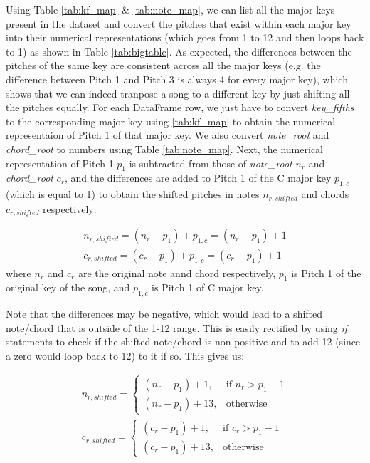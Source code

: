Using Table \ref{tab:kf_map} \& \ref{tab:note_map}, we can list all the major keys present in the dataset and convert the pitches that exist within each major key into their numerical representations (which goes from 1 to 12 and then loops back to 1) as shown in Table \ref{tab:bigtable}. As expected, the differences between the pitches of the same key are consistent across all the major keys (e.g. the difference between Pitch 1 and Pitch 3 is always 4 for every major key), which shows that we can indeed tranpose a song to a different key by just shifting all the pitches equally. For each DataFrame row, we just have to convert \emph{key\_fifths} to the corresponding major key using \ref{tab:kf_map} to obtain the numerical representaion of Pitch 1 of that major key. We also convert \emph{note\_root} and \emph{chord\_root} to numbers using Table \ref{tab:note_map}. Next, the numerical representation of Pitch 1 $p_1$ is subtracted from those of \emph{note\_root} $n_r$ and \emph{chord\_root} $c_r$, and the differences are added to Pitch 1 of the C major key $p_{1,c}$ (which is equal to 1) to obtain the shifted pitches in notes $n_{r,shifted}$ and chords $c_{r,shifted}$ respectively: 

\begin{align} 
    \label{shift note 1}
    n_{r,shifted} = (n_r-p_1)+p_{1,c} = (n_r-p_1)+1\\
    \label{shift chord 2}
    c_{r,shifted} =(c_r-p_1)+p_{1,c} = (c_r-p_1)+1
\end{align}
where $n_r$ and $c_r$ are the original note annd chord respectively, $p_1$ is Pitch 1 of the original key of the song, and $p_{1,c}$ is Pitch 1 of C major key.

Note that the differences may be negative, which would lead to a shifted note/chord that is outside of the 1-12 range. This is easily rectified by using \emph{if} statements to check if the shifted note/chord is non-positive and to add 12 (since a zero would loop back to 12) to it if so. This gives us:

\begin{align}
    \label{shift note 2}
    n_{r,shifted}= 
\begin{cases}
    (n_r-p_1)+1,& \text{if } n_r > p_1-1\\
    (n_r-p_1)+13,              & \text{otherwise}
\end{cases}\\
c_{r,shifted}= 
\begin{cases}
    (c_r-p_1)+1,& \text{if } c_r > p_1-1\\
    (c_r-p_1)+13,              & \text{otherwise}
\end{cases}
\end{align}

